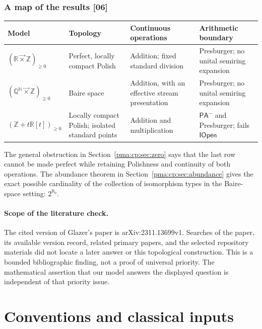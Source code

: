 \documentclass[11pt]{article}
\numberwithin{equation}{section}
\theoremstyle{definition}
\theoremstyle{remark}
\newcommand{\N}{\mathbb N}
\newcommand{\Z}{\mathbb Z}
\newcommand{\Q}{\mathbb Q}
\newcommand{\R}{\mathbb R}
\newcommand{\lex}{\mathbin{\overrightarrow\times}}
\newcommand{\IOpen}{\mathsf{IOpen}}
\newcommand{\src}[1]{\textup{\textsf{\small[#1]}}}
\newcommand{\PAminus}{\mathsf{PA}^{-}}
\begin{document}
\subsubsection{A map of the results \src{06}}

\begin{center}
\small
\begin{tabular}{@{}>{\raggedright\arraybackslash}p{}>{\raggedright\arraybackslash}p{}>{\raggedright\arraybackslash}p{}>{\raggedright\arraybackslash}p{}@{}}
\toprule
Model & Topology & Continuous operations & Arithmetic boundary\\
\midrule
$(\R\lex\Z)_{\geq0}$ & Perfect, locally compact Polish
& Addition; fixed standard division & Presburger; no unital semiring expansion\\[4pt]
$(\Q^{\N}\lex\Z)_{\geq0}$ & Baire space
& Addition, with an effective stream presentation
& Presburger; no unital semiring expansion\\[4pt]
$(\Z+t\R[t])_{\geq0}$ & Locally compact Polish; isolated standard points
& Addition and multiplication
& $\PAminus$ and Presburger; fails $\IOpen$\\
\bottomrule
\end{tabular}
\end{center}

The general obstruction in Section~\ref{pma:cp:sec:zero} says that the last row
cannot be made perfect while retaining Polishness and continuity of both
operations. The abundance theorem in Section~\ref{pma:cp:sec:abundance} gives
the exact possible cardinality of the collection of isomorphism types
in the Baire-space setting: $2^{\aleph_0}$.

\paragraph{Scope of the literature check.}
The cited version of Glazer's paper is arXiv:2311.13699v1. Searches of the
paper, its available version record, related primary papers, and the
selected repository materials did not locate a later answer or this
topological construction. This is a bounded bibliographic finding, not
a proof of universal priority. The mathematical assertion that our model
answers the displayed question is independent of that priority issue.

\section{Conventions and classical inputs}
\label{pma:cp:sec:background}
\end{document}
